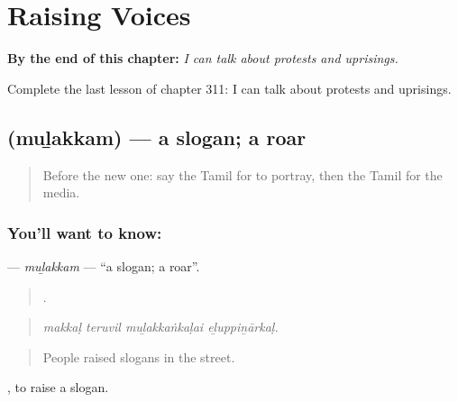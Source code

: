 
\chapter{Raising Voices}
\label{ch:ta-raising-voices}

\begin{chapteropening}
\textbf{By the end of this chapter:} \emph{I can talk about protests and uprisings.}

Complete the last lesson of chapter 311: I can talk about protests and uprisings.
\end{chapteropening}

\section[\texorpdfstring{\ta{முழக்கம்} (muḻakkam)}{முழக்கம் (muḻakkam)}]{ (muḻakkam) — a slogan; a roar}

\label{lesson:TA-C311-mulakkam}



\begin{quote}
Before the new one: say the Tamil for to portray, then the Tamil for the media.
\end{quote}

\subsection*{You'll want to know: }
\textbf{} — \emph{muḻakkam} — \textquotedblleft{}a slogan; a roar\textquotedblright{}.

\begin{quote}
   .
\end{quote}

\begin{quote}
\emph{makkaḷ teruvil muḻakkaṅkaḷai eḻuppiṉārkaḷ.}
\end{quote}

\begin{quote}
People raised slogans in the street.
\end{quote}

 , to raise a slogan.

